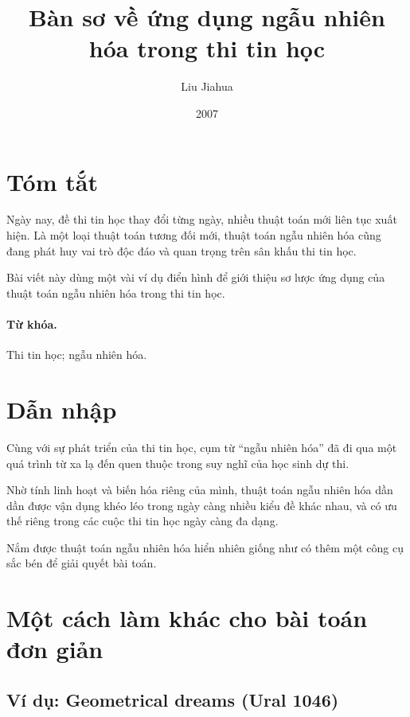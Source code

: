 \documentclass[11pt]{article}
\title{Bàn sơ về ứng dụng ngẫu nhiên hóa trong thi tin học}
\author{Liu Jiahua}
\date{2007}
\begin{document}
\maketitle


\section*{Tóm tắt}

Ngày nay, đề thi tin học thay đổi từng ngày, nhiều thuật toán mới liên tục
xuất hiện. Là một loại thuật toán tương đối mới, thuật toán ngẫu nhiên hóa
cũng đang phát huy vai trò độc đáo và quan trọng trên sân khấu thi tin học.

Bài viết này dùng một vài ví dụ điển hình để giới thiệu sơ lược ứng dụng của
thuật toán ngẫu nhiên hóa trong thi tin học.

\paragraph{Từ khóa.}
Thi tin học; ngẫu nhiên hóa.

\section*{Dẫn nhập}

Cùng với sự phát triển của thi tin học, cụm từ ``ngẫu nhiên hóa'' đã đi qua
một quá trình từ xa lạ đến quen thuộc trong suy nghĩ của học sinh dự thi.

Nhờ tính linh hoạt và biến hóa riêng của mình, thuật toán ngẫu nhiên hóa dần
dần được vận dụng khéo léo trong ngày càng nhiều kiểu đề khác nhau, và có ưu
thế riêng trong các cuộc thi tin học ngày càng đa dạng.

Nắm được thuật toán ngẫu nhiên hóa hiển nhiên giống như có thêm một công cụ
sắc bén để giải quyết bài toán.

\section{Một cách làm khác cho bài toán đơn giản}

\subsection*{Ví dụ: Geometrical dreams (Ural 1046)}
\end{document}
